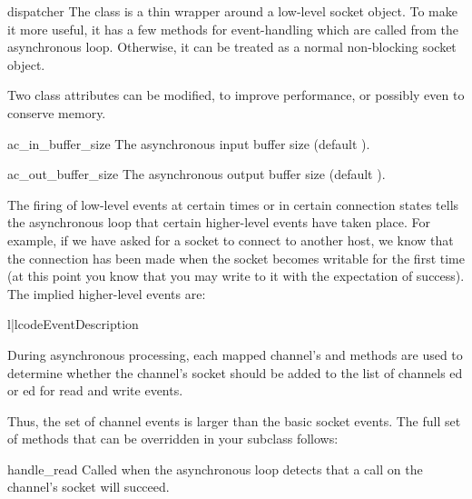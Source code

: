 \begin{classdesc}{dispatcher}{}
  The  class is a thin wrapper around a low-level socket object.
  To make it more useful, it has a few methods for event-handling  which are called
  from the asynchronous loop.  
  Otherwise, it can be treated as a normal non-blocking socket object.

  Two class attributes can be modified, to improve performance,
  or possibly even to conserve memory.

  \begin{datadesc}{ac_in_buffer_size}
  The asynchronous input buffer size (default ).
  \end{datadesc}

  \begin{datadesc}{ac_out_buffer_size}
  The asynchronous output buffer size (default ).
  \end{datadesc}

  The firing of low-level events at certain times or in certain connection
  states tells the asynchronous loop that certain higher-level events have
  taken place. For example, if we have asked for a socket to connect to
  another host, we know that the connection has been made when the socket
  becomes writable for the first time (at this point you know that you may
  write to it with the expectation of success). The implied higher-level
  events are:

  \begin{tableii}{l|l}{code}{Event}{Description}
  \end{tableii}

  During asynchronous processing, each mapped channel's 
  and  methods are used to determine whether the channel's
  socket should be added to the list of channels ed or
  ed for read and write events.

\end{classdesc}

Thus, the set of channel events is larger than the basic socket events.
The full set of methods that can be overridden in your subclass follows:

\begin{methoddesc}{handle_read}{}
  Called when the asynchronous loop detects that a 
  call on the channel's socket will succeed.
\end{methoddesc}

